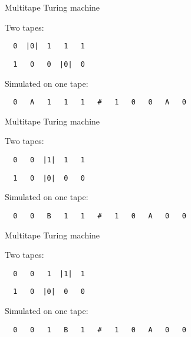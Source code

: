 \documentclass[
  ignorenonframetext,
]{beamer}
\begin{document}
\begin{frame}[fragile]{Multitape Turing machine}
\protect\hypertarget{multitape-turing-machine-4}{}

Two tapes:

\begin{verbatim}
  0  |0|  1   1   1
\end{verbatim}

\begin{verbatim}
  1   0   0  |0|  0
\end{verbatim}

Simulated on one tape:

\begin{verbatim}
  0   A   1   1   1   #   1   0   0   A   0
\end{verbatim}

\end{frame}

\begin{frame}[fragile]{Multitape Turing machine}
\protect\hypertarget{multitape-turing-machine-5}{}

Two tapes:

\begin{verbatim}
  0   0  |1|  1   1
\end{verbatim}

\begin{verbatim}
  1   0  |0|  0   0
\end{verbatim}

Simulated on one tape:

\begin{verbatim}
  0   0   B   1   1   #   1   0   A   0   0
\end{verbatim}

\end{frame}

\begin{frame}[fragile]{Multitape Turing machine}
\protect\hypertarget{multitape-turing-machine-6}{}

Two tapes:

\begin{verbatim}
  0   0   1  |1|  1
\end{verbatim}

\begin{verbatim}
  1   0  |0|  0   0
\end{verbatim}

Simulated on one tape:

\begin{verbatim}
  0   0   1   B   1   #   1   0   A   0   0
\end{verbatim}

\end{frame}
\end{document}
